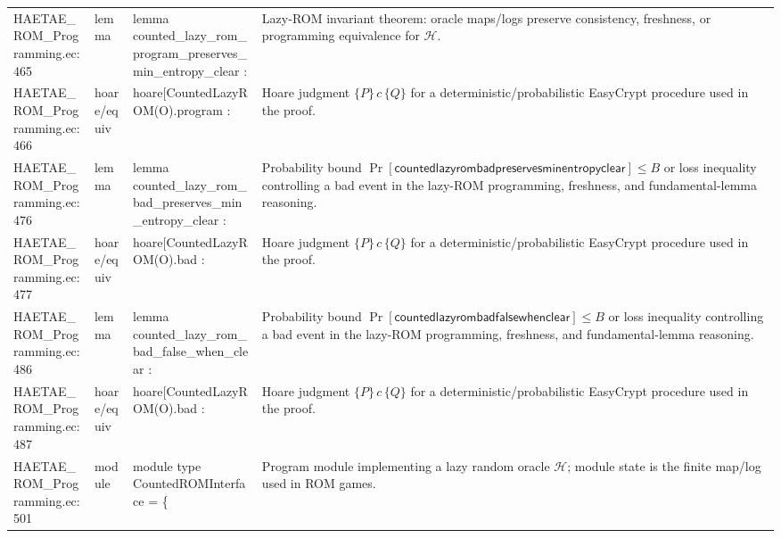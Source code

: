 \documentclass[10pt]{article}
\begin{document}
\begin{longtable}{L{0.11\textwidth}L{0.055\textwidth}L{0.385\textwidth}L{0.41\textwidth}}
HAETAE\_\allowbreak{}ROM\_\allowbreak{}Programming.\allowbreak{}ec:\allowbreak{}465 & lemma & {\ttfamily\scriptsize lemma counted\_\allowbreak{}lazy\_\allowbreak{}rom\_\allowbreak{}program\_\allowbreak{}preserves\_\allowbreak{}min\_\allowbreak{}entropy\_\allowbreak{}clear :} & Lazy-ROM invariant theorem: oracle maps/logs preserve consistency, freshness, or programming equivalence for $\mathcal H$. \\
HAETAE\_\allowbreak{}ROM\_\allowbreak{}Programming.\allowbreak{}ec:\allowbreak{}466 & hoare/equiv & {\ttfamily\scriptsize hoare[CountedLazyROM(O).program :} & Hoare judgment $\{P\}\,c\,\{Q\}$ for a deterministic/probabilistic EasyCrypt procedure used in the proof. \\
HAETAE\_\allowbreak{}ROM\_\allowbreak{}Programming.\allowbreak{}ec:\allowbreak{}476 & lemma & {\ttfamily\scriptsize lemma counted\_\allowbreak{}lazy\_\allowbreak{}rom\_\allowbreak{}bad\_\allowbreak{}preserves\_\allowbreak{}min\_\allowbreak{}entropy\_\allowbreak{}clear :} & Probability bound $\Pr[\mathsf{countedlazyrombadpreservesminentropyclear}]\le B$ or loss inequality controlling a bad event in the lazy-ROM programming, freshness, and fundamental-lemma reasoning. \\
HAETAE\_\allowbreak{}ROM\_\allowbreak{}Programming.\allowbreak{}ec:\allowbreak{}477 & hoare/equiv & {\ttfamily\scriptsize hoare[CountedLazyROM(O).bad :} & Hoare judgment $\{P\}\,c\,\{Q\}$ for a deterministic/probabilistic EasyCrypt procedure used in the proof. \\
HAETAE\_\allowbreak{}ROM\_\allowbreak{}Programming.\allowbreak{}ec:\allowbreak{}486 & lemma & {\ttfamily\scriptsize lemma counted\_\allowbreak{}lazy\_\allowbreak{}rom\_\allowbreak{}bad\_\allowbreak{}false\_\allowbreak{}when\_\allowbreak{}clear :} & Probability bound $\Pr[\mathsf{countedlazyrombadfalsewhenclear}]\le B$ or loss inequality controlling a bad event in the lazy-ROM programming, freshness, and fundamental-lemma reasoning. \\
HAETAE\_\allowbreak{}ROM\_\allowbreak{}Programming.\allowbreak{}ec:\allowbreak{}487 & hoare/equiv & {\ttfamily\scriptsize hoare[CountedLazyROM(O).bad :} & Hoare judgment $\{P\}\,c\,\{Q\}$ for a deterministic/probabilistic EasyCrypt procedure used in the proof. \\
HAETAE\_\allowbreak{}ROM\_\allowbreak{}Programming.\allowbreak{}ec:\allowbreak{}501 & module & {\ttfamily\scriptsize module type CountedROMInterface = \{} & Program module implementing a lazy random oracle $\mathcal H$; module state is the finite map/log used in ROM games. \\

\end{longtable}
\end{document}
